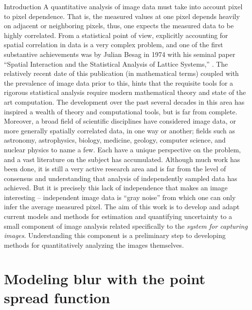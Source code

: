 \begin{chapter}{Introduction}
  A quantitative analysis of image data must take into account pixel to pixel dependence.
  That is, the measured values at one pixel depends heavily on adjacent or neighboring pixels, thus, one expects the measured data to be highly correlated.
  From a statistical point of view, explicitly accounting for spatial correlation in data is a very complex problem, and one of the first substantive achievements was by Julian Besag in 1974 with his seminal paper ``Spatial Interaction and the Statistical Analysis of Lattice Systems,'' \citep{besag1974}.
  The relatively recent date of this publication (in mathematical terms) coupled with the prevalence of image data prior to this, hints that the requisite tools for a rigorous statistical analysis require modern mathematical theory and state of the art computation.
  The development over the past several decades in this area has inspired a wealth of theory and computational tools, but is far from complete.
  Moreover, a broad field of scientific disciplines have considered image data, or more generally spatially correlated data, in one way or another; fields such as astronomy, astrophysics, biology, medicine, geology, computer science, and nuclear physics to name a few.
  Each have a unique perspective on the problem, and a vast literature on the subject \citep{cressie1993statistics,andOthers} has accumulated.
  Although much work has been done, it is still a very active research area and is far from the level of consensus and understanding that analysis of independently sampled data has achieved. 
  But it is precisely this lack of independence that makes an image interesting -- independent image data is ``gray noise'' from which one can only infer the average measured pixel.
  The aim of this work is to develop and adapt current models and methods for estimation and quantifying uncertainty to a small component of image analysis related specifically to the \emph{system for capturing images}.
  Understanding this component is a preliminary step to developing methods for quantitatively analyzing the images themselves.

\section{Modeling blur with the point spread function}
  

\end{chapter}

